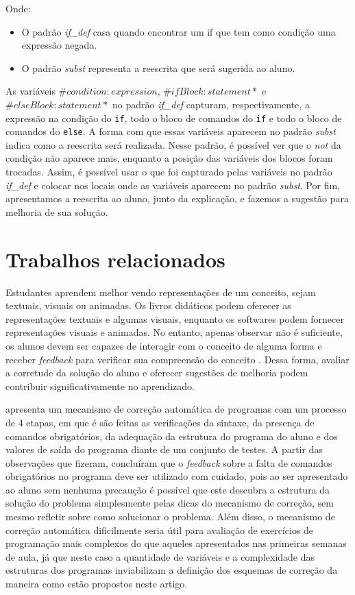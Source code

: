 \documentclass[12pt]{article}
\begin{document}
Onde:
\begin{itemize}
  \item O padrão \textit{if\_def} casa quando encontrar um if que tem como
    condição uma expressão negada.
  \item O padrão \textit{subst} representa a reescrita que será sugerida ao
    aluno.
\end{itemize}

As variáveis \(\#condition:expression\), \(\#ifBlock:statement*\) e \(\#elseBlock:statement*\) 
no padrão \textit{if\_def} capturam, respectivamente, a expressão na condição do 
\texttt{if}, todo o bloco  de comandos do \texttt{if} e todo o bloco de comandos
do \texttt{else}.
A forma com que essas variáveis aparecem no padrão \textit{subst} indica como a
reescrita será realizada. Nesse padrão, é possível ver que o \textit{not} da condição
não aparece mais, enquanto a posição das variáveis dos blocos foram trocadas.
Assim, é possível usar o que foi capturado pelas variáveis no padrão \textit{if\_def}
e colocar nos locais onde as variáveis aparecem no padrão \textit{subst}.
Por fim, apresentamos a reescrita ao aluno, junto da explicação, e fazemos a 
sugestão para melhoria de sua solução.

\section{Trabalhos relacionados}

Estudantes aprendem melhor vendo representações de um conceito, sejam textuais, 
visuais ou animadas. Os livros didáticos podem oferecer as representações 
textuais e algumas visuais, enquanto os softwares podem fornecer representações 
visuais e animadas. No entanto, apenas observar não é suficiente, os alunos 
devem ser capazes de interagir com o conceito de alguma forma e receber 
\textit{feedback} para verificar sua compreensão do conceito 
\cite{rodger2002-hands-on-visualization}.
Dessa forma, avaliar a corretude da solução do aluno e oferecer sugestões de
melhoria podem contribuir significativamente no aprendizado.

\cite{pelz2012-mecanismo-correcao-automatica} apresenta um mecanismo de correção
automática de programas com um processo de 4 etapas, em que é são feitas as 
verificações da sintaxe, da presença de comandos obrigatórios, da adequação da
estrutura do programa do aluno e dos valores de saída do programa diante de um
conjunto de testes. A partir das observações que fizeram, concluíram que o 
\textit{feedback} sobre a falta de comandos obrigatórios no programa deve ser
utilizado com cuidado, pois ao ser apresentado ao aluno sem nenhuma precaução
é possível que este descubra a estrutura da solução do problema simplesmente
pelas dicas do mecanismo de correção, sem mesmo refletir sobre como solucionar
o problema. Além disso, o mecanismo de correção automática dificilmente seria 
útil para avaliação de exercícios de programação mais complexos do que aqueles 
apresentados nas primeiras semanas de aula, já que neste caso a quantidade de 
variáveis e a complexidade das estruturas dos programas inviabilizam a definição 
dos esquemas de correção da maneira como estão propostos neste artigo.
\end{document}
